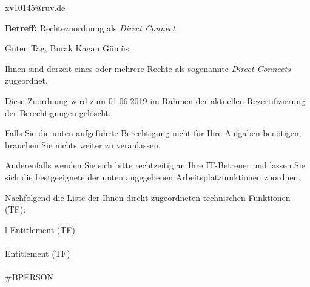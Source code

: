 \documentclass[a4paper,landscape,12pt]{letter}
\begin{document}
\begin{letter}{xv10145@ruv.de\hfill \break}
\begin{normalsize}
	\opening{\textbf{Betreff:} Rechtezuordnung als \emph{Direct Connect}}
	\begin{normalsize} \hfill
	\end{normalsize}

	\begin{normalsize}
		Guten Tag, 
	Burak Kagan Gümüs, \hfill \break
	\end{normalsize}
	\end{normalsize}
	
\begin{normalsize}
	Ihnen sind derzeit eines oder mehrere Rechte als sogenannte \emph{Direct Connects} zugeordnet.
	
	Diese Zuordnung wird zum 01.06.2019 im Rahmen der aktuellen Rezertifizierung der Berechtigungen gelöscht.
	
	Falls Sie die unten aufgeführte Berechtigung nicht für Ihre Aufgaben benötigen, 
	brauchen Sie nichts weiter zu veranlassen.
	
	Anderenfalls wenden Sie sich bitte rechtzeitig an Ihre IT-Betreuer 
	und lassen Sie sich die bestgeeignete der unten angegebenen Arbeitsplatzfunktionen zuordnen.
	\end{normalsize}
	
\begin{normalsize}
	Nachfolgend die Liste der Ihnen direkt zugeordneten technischen Funktionen (TF):

	\begin{longtable}{l}
		Entitlement (TF) \\ \hline
		\endfirsthead
		\\\hline
		Entitlement (TF) \\ \hline
		\endhead %
		\multicolumn{1}{r@{}}{Fortsetzung \ldots}\\
		\endfoot
		\hline
		\endlastfoot
	\#BPERSON\\
	\end{longtable}
	\end{normalsize}
	

\end{letter}
\end{document}
